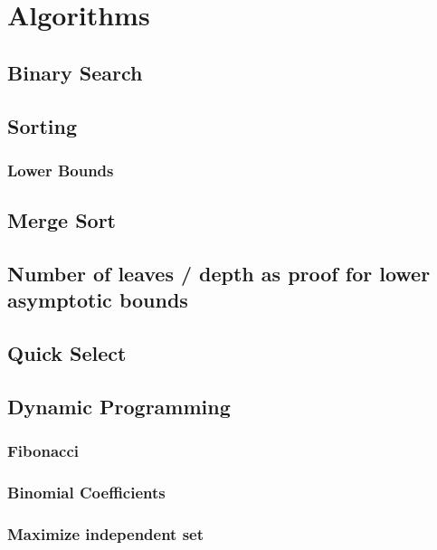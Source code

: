 \documentclass[12pt]{article}
\theoremstyle{definition}
\begin{document}
	\section{Algorithms}

	\subsection{Binary Search}

	\subsection{Sorting}

	\subsubsection{Lower Bounds}

	\subsection{Merge Sort}

	\subsection{Number of leaves / depth as proof for lower asymptotic bounds}

	\subsection{Quick Select}

	\subsection{Dynamic Programming}

	\subsubsection{Fibonacci}

	\subsubsection{Binomial Coefficients}

	\subsubsection{Maximize independent set}
\end{document}

